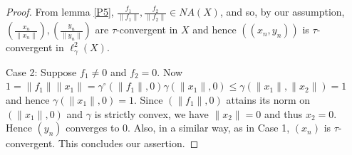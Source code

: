 \documentclass[10pt,a4paper]{amsart}
\newcommand{\cc}{\circ}
\newcommand{\ga}{\gamma}
\begin{document}
\begin{proof}
From lemma \ref{P5}, $\frac{f_1}{\|f_1\|},\frac{f_2}{\|f_2\|}\in NA(X)$, and so, by our assumption, $(\frac{x_n}{\|x_n\|}),(\frac{y_n}{\|y_n\|})$ are $\tau$-convergent in $X$ and hence $((x_n,y_n))$ is $\tau$-convergent in $\ell_\ga^2(X)$. 



{\sc Case 2:} Suppose $f_1\neq0$ and $f_2=0$. Now $1=\|f_1\|\|x_1\|=\ga^\cc(\|f_1\|,0)\ga(\|x_1\|,0)\leq \ga(\|x_1\|,\|x_2\|)=1$ and hence $\ga(\|x_1\|,0)=1$. Since $(\|f_1\|,0)$ attains its norm on $(\|x_1\|,0)$ and $\ga$ is strictly convex, we have $\|x_2\|=0$ and thus $x_2=0$. Hence $(y_n)$ converges to 0. Also, in a similar way, as in Case 1, $(x_n)$ is $\tau$-convergent. This concludes our assertion. 
\end{proof}
\end{document}
